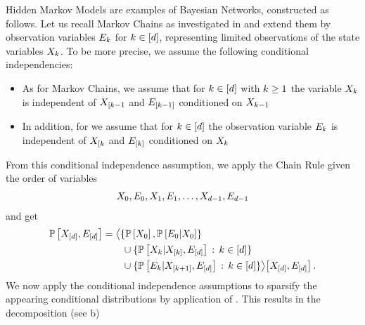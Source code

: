 Hidden Markov Models are examples of Bayesian Networks, constructed as follows.
Let us recall Markov Chains as investigated in  and extend them by observation variables $E_{k}$ for $k\in[d]$, representing limited observations of the state variables $X_{k}$.
To be more precise, we assume the following conditional independencies:
\begin{itemize}
    \item As for Markov Chains, we assume that for $k\in[d]$ with $k\geq1$ the variable $X_{k}$ is independent of $X_{[k-1}$ and $E_{[k-1]}$ conditioned on $X_{k-1}$
    \item In addition, for we assume that for $k\in[d]$ the observation variable $E_{k}$ is independent of $X_{[k}$ and $E_{[k]}$ conditioned on $X_{k}$
\end{itemize}
From this conditional independence assumption, we apply the Chain Rule  given the order of variables
\begin{align*}
    X_{0},E_{0},X_{1},E_{1},\ldots,X_{d-1},E_{d-1}
\end{align*}
and get
\begin{align*}
    \mathbb{P}\left[X_{[d]},E_{[d]}\right]
    & = \big\langle 
        \{\mathbb{P}\left[X_{0}\right],\mathbb{P}\left[E_{0}|X_{0}\right]\} \\
        & \quad\quad  \cup \{\mathbb{P}\left[X_{k}|X_{[k]},E_{[d]}\right] \,:\, k\in[d]\} \\
        & \quad\quad \cup \{\mathbb{P}\left[E_{k}|X_{[k+1]},E_{[d]}\right] \,:\, k\in[d]\}
     \big\rangle \big[ 
        X_{[d]},E_{[d]}
     \big] \, .
\end{align*}
We now apply the conditional independence assumptions to sparsify the appearing conditional distributions by application of .
This results in the decomposition (see b)
